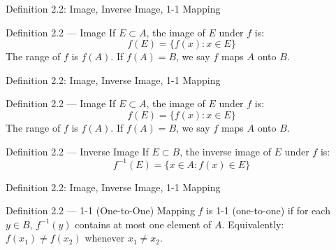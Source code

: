 \documentclass[aspectratio=169,12pt,t]{beamer}
\begin{document}
{%
\begin{frame}{Definition 2.2: Image, Inverse Image, 1-1 Mapping}
  \begin{defblock}{Definition 2.2 --- Image}
    If $E \subset A$, the \alert{image} of $E$ under $f$ is:
    \[
      f(E) = \{f(x) : x \in E\}
    \]
    The range of $f$ is $f(A)$. If $f(A) = B$, we say $f$ maps $A$ \alert{onto} $B$.
  \end{defblock}

\end{frame}

\begin{frame}{Definition 2.2: Image, Inverse Image, 1-1 Mapping}
  \begin{defblock}{Definition 2.2 --- Image}
    If $E \subset A$, the \alert{image} of $E$ under $f$ is:
    \[
      f(E) = \{f(x) : x \in E\}
    \]
    The range of $f$ is $f(A)$. If $f(A) = B$, we say $f$ maps $A$ \alert{onto} $B$.
  \end{defblock}

  \begin{defblock}{Definition 2.2 --- Inverse Image}
    If $E \subset B$, the \alert{inverse image} of $E$ under $f$ is:
    \[
      f^{-1}(E) = \{x \in A : f(x) \in E\}
    \]
  \end{defblock}

\end{frame}

\begin{frame}{Definition 2.2: Image, Inverse Image, 1-1 Mapping}
  \begin{defblock}{Definition 2.2 --- 1-1 (One-to-One) Mapping}
    $f$ is \alert{1-1} (one-to-one) if for each $y \in B$, $f^{-1}(y)$ contains
    at most one element of $A$.
    Equivalently: $f(x_1) \neq f(x_2)$ whenever $x_1 \neq x_2$.
  \end{defblock}


\end{frame}}
\end{document}
